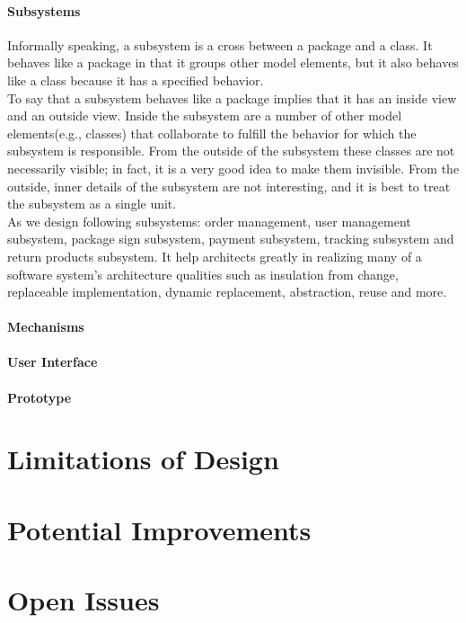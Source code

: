\documentclass[12pt]{scrreprt}
\begin{document}
\subsubsection{Subsystems}
Informally speaking, a subsystem is a cross between a package and a class. It behaves like a package in that it groups other model elements, but it also behaves like a class because it has a specified behavior.\\
To say that a subsystem behaves like a package implies that it has an inside view and an outside view. Inside the subsystem are a number of other model elements(e.g., classes) that collaborate to fulfill the behavior for which the subsystem is responsible. From the outside of the subsystem these classes are not necessarily visible; in fact, it is a very good idea to make them invisible. From the outside, inner details of the subsystem are not interesting, and it is best to treat the subsystem as a single unit.\\
As we design following subsystems: order management, user management subsystem, package sign subsystem, payment subsystem, tracking subsystem and return products subsystem. It help architects greatly in realizing many of a software system's architecture qualities such as insulation from change, replaceable implementation, dynamic replacement, abstraction, reuse and more.
\subsubsection{Mechanisms}

\subsubsection{User Interface}

\subsubsection{Prototype}

\chapter{Limitations of Design}


\chapter{Potential Improvements}


\chapter{Open Issues}
\end{document}
